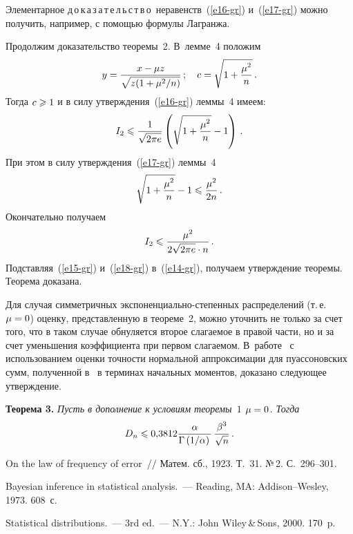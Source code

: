 \begin{multicols}{2}
\smallskip

Элементарное {д\,о\,к\,а\,з\,а\,т\,е\,л\,ь\,с\,т\,в\,о}\ неравенств~(\ref{e16-gr}) 
и~(\ref{e17-gr}) можно
получить, например, с помощью формулы Лагранжа.

\pagebreak

Продолжим доказательство теоремы~2. В~лемме~4 положим
$$
y=\displaystyle\frac{\displaystyle x-\mu z\mathstrut}{\displaystyle \sqrt{z(1+{\mu^2}/{n})}\mathstrut}\,;\quad
c=\sqrt{1+\displaystyle\frac{\displaystyle \mu^2\mathstrut}{\displaystyle n\mathstrut}}\,.
$$
Тогда $c\hm\geqslant1$ и в силу утверждения~(\ref{e16-gr}) леммы~4 имеем:
$$
I_2\leqslant\displaystyle\frac{\displaystyle 1\mathstrut}{\displaystyle \sqrt{2\pi e}\mathstrut}\left(\sqrt{1+\displaystyle\frac{\displaystyle \mu^2\mathstrut}{\displaystyle n\mathstrut}}-1\right)\,.
$$
При этом в силу утверждения~(\ref{e17-gr}) леммы~4
$$
\sqrt{1+\displaystyle\frac{\displaystyle \mu^2\mathstrut}{\displaystyle n\mathstrut}}-1\leqslant\displaystyle\frac{\displaystyle \mu^2\mathstrut}{\displaystyle 2n\mathstrut}\,.
$$
Окончательно получаем
\begin{equation}
I_2\leqslant\displaystyle\frac{\displaystyle \mu^2\mathstrut}{\displaystyle 2\sqrt{2\pi e}\cdot n\mathstrut}\,.\label{e18-gr}
\end{equation}
Подставляя~(\ref{e15-gr}) и~(\ref{e18-gr}) в~(\ref{e14-gr}), получаем утверждение теоремы. 
Теорема доказана.

\smallskip

Для случая симметричных экс\-по\-нен\-ци\-аль\-но-сте\-пен\-ных распределений (т.\,е.\ 
$\mu\hm=0$) оценку, представленную в теореме~2, можно уточнить не
только за счет того, что в таком случае обнуляется второе слагаемое
в правой части, но и за счет уменьшения коэффициента при первом
слагаемом. В~работе~\cite{KBZZ2012} с использованием оценки точности
нормальной аппроксимации для пуассоновских сумм, полученной 
в~\cite{KorolevShevtsova2010} в терминах начальных моментов, доказано следующее утверждение.

\smallskip

\noindent
\textbf{Теорема 3.} \textit{Пусть в дополнение к условиям теоремы~$1$
$\mu\hm=0$. Тогда}
$$
D_n\leqslant
0{,}3812\displaystyle\frac{\displaystyle \alpha\mathstrut}{\displaystyle \Gamma\left({1}/{\alpha}\right)\mathstrut}\,\displaystyle\frac{\displaystyle \beta^3\mathstrut}{\displaystyle \sqrt{n}\mathstrut}\,.
$$

{\small\frenchspacing
{%
\begin{thebibliography}{99}
 On the law of frequency of error~//
Матем. сб., 1923. Т.~31. №\,2. С.~296--301.

 Bayesian inference in statistical analysis.~--- 
Reading, MA: Addison--Wesley, 1973. 608~с.

 Statistical distributions.~---
3rd ed.~--- N.Y.: John Wiley\,\&\,Sons, 2000. 170~p.


\end{thebibliography}}}
\end{multicols}
